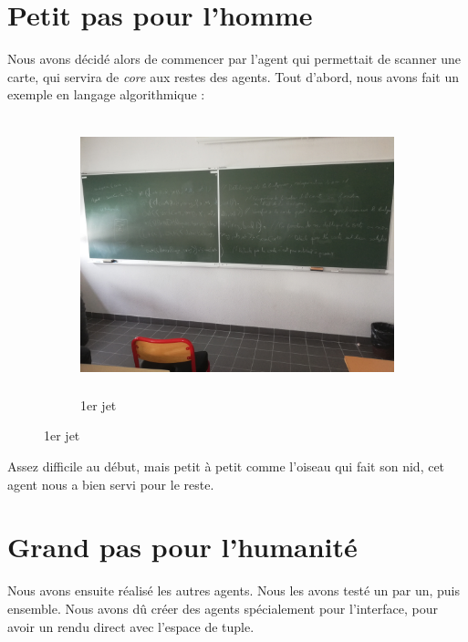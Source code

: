 \documentclass[a4paper,10pt]{article}
\begin{document}
    \section{Petit pas pour l'homme}
    Nous avons décidé alors de commencer par l'agent qui permettait de scanner une carte, qui servira de \textit{core} aux restes des agents. Tout d'abord, nous avons fait un exemple en langage algorithmique :
    \begin{figure}[h]
        \begin{subfigure}{1.0\textwidth}
            \includegraphics[width=1.2\linewidth, height=8cm]{image/tableau.jpg}
             \caption{1er jet}
             \label{fig:tableau}
        \end{subfigure}
    \end{figure}

    Assez difficile au début, mais petit à petit comme l'oiseau qui fait son nid, cet agent nous a bien servi pour le reste.

    \pagebreak
    \section{Grand pas pour l'humanité}
    Nous avons ensuite réalisé les autres agents. Nous les avons testé un par un, puis ensemble. Nous avons dû créer des agents spécialement pour l'interface, pour avoir un rendu direct avec l'espace de tuple.
\end{document}
